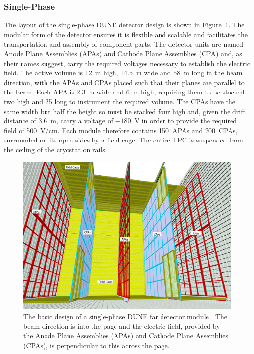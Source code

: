 \subsubsection{Single-Phase}\label{sec:DUNESinglePhase}

The layout of the single-phase DUNE detector design is shown in Figure~\ref{fig:DUNEFarDetectorDesign}.  The modular form of the detector ensures it is flexible and scalable and facilitates the transportation and assembly of component parts.  The detector units are named Anode Plane Assemblies (APAs) and Cathode Plane Assemblies (CPA) and, as their names suggest, carry the required voltages necessary to establish the electric field.  The active volume is 12~m high, 14.5~m wide and 58~m long in the beam direction, with the APAs and CPAs placed such that their planes are parallel to the beam.  Each APA is 2.3~m wide and 6~m high, requiring them to be stacked two high and 25 long to instrument the required volume.  The CPAs have the same width but half the height so must be stacked four high and, given the drift distance of 3.6~m, carry a voltage of $-180$~V in order to provide the required field of 500~V/cm.  Each module therefore contains 150~APAs and 200~CPAs, surrounded on its open sides by a field cage.  The entire TPC is suspended from the ceiling of the cryostat on rails.

\begin{figure}
  \centering
  \includegraphics[width=14cm]{DUNEFarDetectorDesign.png}
  \caption[The basic design of a single-phase DUNE far detector module.]{The basic design of a single-phase DUNE far detector module \cite{DUNECDR4}.  The beam direction is into the page and the electric field, provided by the Anode Plane Assemblies (APAs) and Cathode Plane Assemblies (CPAs), is perpendicular to this across the page.}
  \label{fig:DUNEFarDetectorDesign}
\end{figure}

